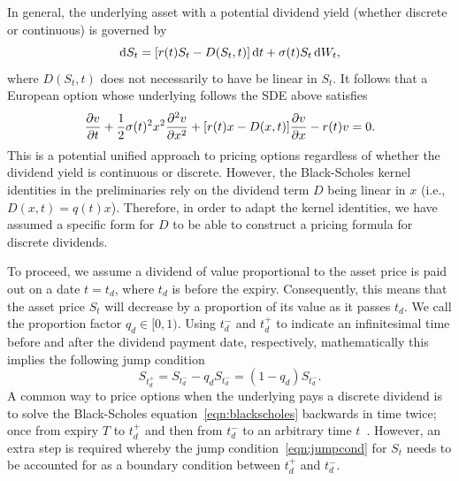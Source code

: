 In general, the underlying asset with a potential dividend yield (whether discrete or continuous) is governed by~\cite{Wilmott1995}
	\begin{equation*}
		\mathrm d S_t = [r(t)S_t - D(S_t,t)] \, \mathrm d t + \sigma(t) S_t  \, \mathrm d W_t,
	\end{equation*}
where $D(S_t,t)$ does not necessarily to have be linear in $S_t$. It follows that a European option whose underlying follows the SDE above satisfies
	\begin{equation*}
		\frac{\partial v}{\partial t} + \frac{1}{2}\sigma(t)^2x^2\frac{\partial^2 v}{\partial x^2} + [r(t)x - D(x,t)]\frac{\partial v}{\partial x} - r(t)v = 0.
	\end{equation*}
This is a potential unified approach to pricing options regardless of whether the dividend yield is continuous or discrete. However, the Black-Scholes kernel identities in the preliminaries rely on the dividend term $D$ being linear in $x$ (i.e., $D(x,t) = q(t)x$). Therefore, in order to adapt the kernel identities, we have assumed a specific form for $D$ to be able to construct a pricing formula for discrete dividends.

To proceed, we assume a dividend of value proportional to the asset price is paid out on a date $t = t_d$, where $t_d$ is before the expiry. Consequently, this means that the asset price $S_t$ will decrease by a proportion of its value as it passes $t_d$. We call the proportion factor $q_d \in [0,1)$. Using $t_d^-$ and $t_d^+$ to indicate an infinitesimal time before and after the dividend payment date, respectively, mathematically this implies the following jump condition
	\begin{equation}
		\label{eqn:jumpcond}
		S_{t_d^+} = S_{t_d^-} - q_dS_{t_d^-} = (1-q_d)S_{t_d^-}.
	\end{equation}
A common way to price options when the underlying pays a discrete dividend is to solve the Black-Scholes equation~\eqref{eqn:blackscholes} backwards in time twice; once from expiry $T$ to $t_d^+$ and then from $t_d^-$ to an arbitrary time $t$~\cite{Wilmott1995, Jiang2005}. However, an extra step is required whereby the jump condition~\eqref{eqn:jumpcond} for $S_t$ needs to be accounted for as a boundary condition between $t_d^+$ and $t_d^-$.

